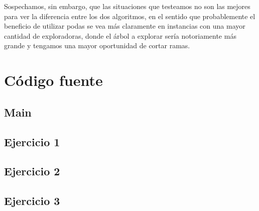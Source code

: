 \documentclass{article}
\theoremstyle{definition}
\theoremstyle{remark}
\begin{document}
Sospechamos, sin embargo, que las situaciones que testeamos no son las mejores para ver la diferencia entre los dos algoritmos, en el sentido que probablemente el beneficio de utilizar podas se vea más claramente en instancias con una mayor cantidad de exploradoras, donde el árbol a explorar sería notoriamente más grande y tengamos una mayor oportunidad de cortar ramas.

\pagebreak

\section{Código fuente}

\subsection{Main}


\subsection{Ejercicio 1}



\subsection{Ejercicio 2}



\subsection{Ejercicio 3}


\end{document}

